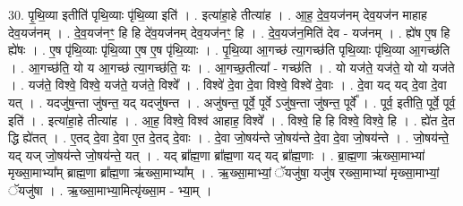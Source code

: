 \documentclass[17pt]{extarticle}
\begin{document}
30. पृ॒थि॒व्या इतीति॑ पृथि॒व्याः पृ॑थि॒व्या इति॑ । . इत्या॑हा॒हे तीत्या॑ह । . आ॒ह॒ दे॒व॒यज॑नम् देव॒यज॑न माहाह देव॒यज॑नम् । . दे॒व॒यज॑नꣳ॒॒ हि हि दे॑व॒यज॑नम् देव॒यज॑नꣳ॒॒ हि । . दे॒व॒यज॑न॒मिति॑ देव - यज॑नम् । . ह्ये॑ष ए॒ष हि ह्ये॑षः । . ए॒ष पृ॑थि॒व्याः पृ॑थि॒व्या ए॒ष ए॒ष पृ॑थि॒व्याः । . पृ॒थि॒व्या आ॒गच्छ॑ त्या॒गच्छ॑ति पृथि॒व्याः पृ॑थि॒व्या आ॒गच्छ॑ति । . आ॒गच्छ॑ति॒ यो य आ॒गच्छ॑ त्या॒गच्छ॑ति॒ यः । . आ॒गच्छ॒तीत्या᳚ - गच्छ॑ति । . यो यज॑ते॒ यज॑ते॒ यो यो यज॑ते । . यज॑ते॒ विश्वे॒ विश्वे॒ यज॑ते॒ यज॑ते॒ विश्वे᳚ । . विश्वे॑ दे॒वा दे॒वा विश्वे॒ विश्वे॑ दे॒वाः । . दे॒वा यद् यद् दे॒वा दे॒वा यत् । . यदजु॑ष॒न्ता जु॑षन्त॒ यद् यदजु॑षन्त । . अजु॑षन्त॒ पूर्वे॒ पूर्वे ऽजु॑ष॒न्ता जु॑षन्त॒ पूर्वे᳚ । . पूर्व॒ इतीति॒ पूर्वे॒ पूर्व॒ इति॑ । . इत्या॑हा॒हे तीत्या॑ह । . आ॒ह॒ विश्वे॒ विश्व॑ आहाह॒ विश्वे᳚ । . विश्वे॒ हि हि विश्वे॒ विश्वे॒ हि । . ह्ये॑त दे॒त द्धि ह्ये॑तत् । . ए॒तद् दे॒वा दे॒वा ए॒त दे॒तद् दे॒वाः । . दे॒वा जो॒षय॑न्ते जो॒षय॑न्ते दे॒वा दे॒वा जो॒षय॑न्ते । . जो॒षय॑न्ते॒ यद् यज् जो॒षय॑न्ते जो॒षय॑न्ते॒ यत् । . यद् ब्रा᳚ह्म॒णा ब्रा᳚ह्म॒णा यद् यद् ब्रा᳚ह्म॒णाः । . ब्रा॒ह्म॒णा ऋ॑ख्सा॒माभ्या॑ मृख्सा॒माभ्या᳚म् ब्राह्म॒णा ब्रा᳚ह्म॒णा ऋ॑ख्सा॒माभ्या᳚म् । . ऋ॒ख्सा॒माभ्यां॒ ॅयजु॑षा॒ यजु॑ष र्‌ख्सा॒माभ्या॑ मृख्सा॒माभ्यां॒ ॅयजु॑षा । . ऋ॒ख्सा॒माभ्या॒मित्यृ॑ख्सा॒म - भ्या॒म् । \newline
\end{document}
